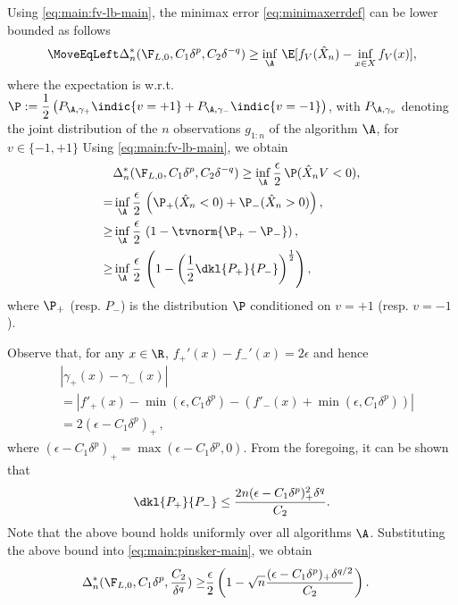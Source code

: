 Using \eqref{eq:main:fv-lb-main}, the minimax error \eqref{eq:minimaxerrdef} can be lower bounded as follows
\begin{align*}
\MoveEqLeft
\Delta_n^*(\F_{L,0}, C_1 \delta^p ,C_2 \delta^{-q}) %
  \ge  \inf_{\A} \,  \E[f_V(\hat X_n) - \inf_{x \in X}
  f_V(x)],
  \end{align*}
where the expectation is w.r.t. $\P:= \dfrac{1}{2} \left(P_{\A, \gamma_+} \indic{v=+1} + P_{\A, \gamma_-}\indic{v=-1}\right)$, with $P_{\A,\gamma_v}$ denoting the joint distribution of the $n$ observations $g_{1:n}$ of the algorithm $\A$, for $v \in \{-1,+1\}$
Using \eqref{eq:main:fv-lb-main}, we obtain
\begin{align}
&\Delta_n^*(\F_{L,0}, C_1 \delta^p ,C_2 \delta^{-q})  \ge  \inf_{\A} \dfrac{\epsilon}{2}\,  \P(\hat X_n V < 0), \label{eq:main:strong-convex-bd}\\
  = & \inf_{\A} \dfrac{\epsilon }{2} \, \left(\P_{+}(\hat X_n < 0) + \P_{-}(\hat X_n > 0)\right), \label{eq:main:Pplus}\\
  \ge &\inf_{\A} \dfrac{\epsilon }{2} \,\left(1 - \tvnorm{\P_{+}- \P_{-}}\right), \label{eq:main:lecam}\\
  \ge &\inf_{\A} \dfrac{\epsilon }{2}  \,\left( 1 - \left(\frac12\dkl{P_{+}}{P_{-}}\right)^{\frac{1}{2}}\right), \label{eq:main:pinsker-main}
\end{align}
where $\P_{+}$ (resp. $P_-$) is the distribution $\P$ conditioned on $v=+1$ (resp. $v=-1$).

Observe that, for any $x\in \R$, $f_+'(x) - f_-'(x) = 2\epsilon$ and hence
\begin{align}
& |\gamma_+(x) - \gamma_-(x)| \nonumber\\
& = | f'_+(x) - \min(\epsilon,C_1 \delta^p) - (f'_-(x)+\min(\epsilon,C_1 \delta^p)) | \nonumber \\
& = 2 (\epsilon - C_1 \delta^p)_+\,,
 \label{eq:main:gdiff-ub}
\end{align}
where $(\epsilon - C_1 \delta^p)_+ = \max(\epsilon - C_1 \delta^p,0)$.
From the foregoing, it can be shown that
\begin{align}
\dkl{P_{+}}{P_{-}} \le \dfrac{2n(\epsilon-C_1\delta^p)_+^2 \delta^q}{C_2}.\label{eq:main:dkbd-main}
\end{align}
Note that the above bound holds uniformly over all algorithms $\A$.
Substituting the above bound into \eqref{eq:main:pinsker-main}, we obtain
\begin{align*}
 \Delta_n^*(\F_{L,0}, C_1 \delta^p ,\frac{C_2}{\delta^{q}})
  \ge & \frac{\epsilon}{2} \left(1 - \sqrt{
    n}  \frac{(\epsilon-C_1\delta^p)_+\delta^{q/2}}{C_2}
  \right).\label{eq:main:final-lower-bd}
\end{align*}

